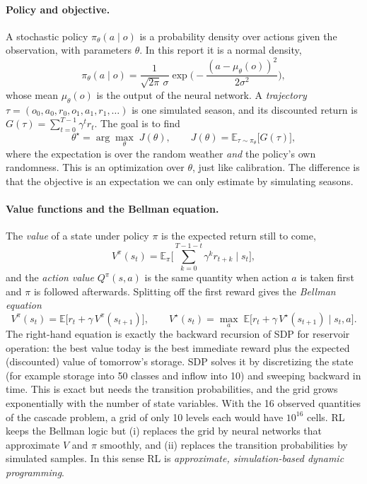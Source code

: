 \paragraph{Policy and objective.} A stochastic policy $\pi_\theta(a\mid o)$
is a probability density over actions given the observation, with
parameters $\theta$. In this report it is a normal density,
\[
\pi_\theta(a\mid o)=\frac{1}{\sqrt{2\pi}\,\sigma}\exp\!\Big(-\frac{(a-\mu_\theta(o))^2}{2\sigma^2}\Big),
\]
whose mean $\mu_\theta(o)$ is the output of the neural network. A
\emph{trajectory} $\tau=(o_0,a_0,r_0,o_1,a_1,r_1,\dots)$ is one simulated
season, and its discounted return is $G(\tau)=\sum_{t=0}^{T-1}\gamma^t r_t$.
The goal is to find
\begin{equation}
\theta^\star=\arg\max_\theta\; J(\theta),\qquad J(\theta)=\mathbb E_{\tau\sim\pi_\theta}\big[G(\tau)\big],
\label{eq:rl_objective}
\end{equation}
where the expectation is over the random weather \emph{and} the policy's
own randomness. This is an optimization over $\theta$, just like
calibration. The difference is that the objective is an expectation we can
only estimate by simulating seasons.

\paragraph{Value functions and the Bellman equation.} The \emph{value} of a
state under policy $\pi$ is the expected return still to come,
\[
V^\pi(s_t)=\mathbb E_\pi\Big[\sum_{k=0}^{T-1-t}\gamma^k r_{t+k}\;\Big|\;s_t\Big],
\]
and the \emph{action value} $Q^\pi(s,a)$ is the same quantity when action
$a$ is taken first and $\pi$ is followed afterwards. Splitting off the
first reward gives the \emph{Bellman equation}
\begin{equation}
V^\pi(s_t)=\mathbb E\big[r_t+\gamma\,V^\pi(s_{t+1})\big],
\qquad
V^\star(s_t)=\max_{a}\;\mathbb E\big[r_t+\gamma\,V^\star(s_{t+1})\;\big|\;s_t,a\big].
\label{eq:bellman}
\end{equation}
The right-hand equation is exactly the backward recursion of SDP for
reservoir operation: the best value today is the best immediate reward plus
the expected (discounted) value of tomorrow's storage. SDP solves it by
discretizing the state (for example storage into 50 classes and inflow into
10) and sweeping backward in time. This is exact but needs the transition
probabilities, and the grid grows exponentially with the number of state
variables. With the 16 observed quantities of the cascade problem, a grid
of only 10 levels each would have $10^{16}$ cells. RL keeps the Bellman
logic but (i) replaces the grid by neural networks that approximate $V$ and
$\pi$ smoothly, and (ii) replaces the transition probabilities by simulated
samples. In this sense RL is \emph{approximate, simulation-based dynamic
programming}.


